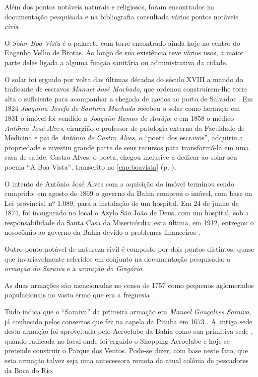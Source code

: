 Além dos pontos notáveis naturais e religiosos, foram encontrados na documentação pesquisada e na bibliografia consultada vários pontos notáveis \textit{civis}.

O \textit{Solar Boa Vista} é o palacete com torre encontrado ainda hoje no centro do Engenho Velho de Brotas. Ao longo de sua existência teve vários usos, a maior parte deles ligada a alguma função sanitária ou administrativa da cidade.

O solar foi erguido por volta das últimas décadas do século XVIII a mando do traficante de escravos \textit{Manuel José Machado}, que ordenou construírem-lhe torre alta o suficiente para acompanhar a chegada de navios ao porto de Salvador \cite[p.~127]{mattos_panorama_2011}. Em 1824 \textit{Joaquina Josefa de Santana Machado} recebeu o solar como herança; em 1831 o imóvel foi vendido a \textit{Joaquim Ramos de Araújo}; e em 1858 o médico \textit{Antônio José Alves}, cirurgião e professor de patologia externa da Faculdade de Medicina e pai de \textit{Antônio de Castro Alves}, o ``poeta dos escravos'', adquiriu a propriedade e investiu grande parte de seus recursos para transformá-la em uma casa de saúde. Castro Alves, o poeta, chegou inclusive a dedicar ao solar seu poema ``A Boa Vista'', transcrito no \autoref{cap:boavista} (p. \pageref{cap:boavista}).

O intento de Antônio José Alves com a aquisição do imóvel terminou sendo cumprido: em agosto de 1869 o governo da Bahia comprou o imóvel, com base na Lei provincial nº 1.089, para a instalação de um hospital. Em 24 de junho de 1874, foi inaugurado no local o Azylo São João de Deus, com um hospital, sob a responsabilidade da Santa Casa da Misericórdia; esta última, em 1912, entregou o nosocômio ao governo da Bahia devido a problemas financeiros \cite{jacobina_asylo_2001}.

Outro ponto notável de natureza civil é composto por dois pontos distintos, quase que invariavelmente referidos em conjunto na documentação pesquisada: a \textit{armação do Saraiva} e a \textit{armação do Gregório}.

As duas armações são mencionadas no censo de 1757 como pequenos aglomerados populacionais no vasto ermo que era a freguesia \cite[p.~183]{castralmeida_ultramar_1908}.

Tudo indica que o ``Saraiva'' da primeira armação era \textit{Manoel Gonçalves Saraiva}, já conhecido pelos consertos que fez na capela da Pituba em 1673 \cite[p.~11]{ott_engenhos_1996}. A antiga sede desta armação foi aproveitada pelo Aeroclube da Bahia como sua primitiva sede \cite[p.~III-11, verso]{teixeira_doacoes_1978}, quando radicada no local onde foi erguido o Shopping Aeroclube e hoje se pretende construir o Parque dos Ventos. Pode-se dizer, com base neste fato, que esta armação talvez seja uma antecessora remota da atual colônia de pescadores da Boca do Rio.

